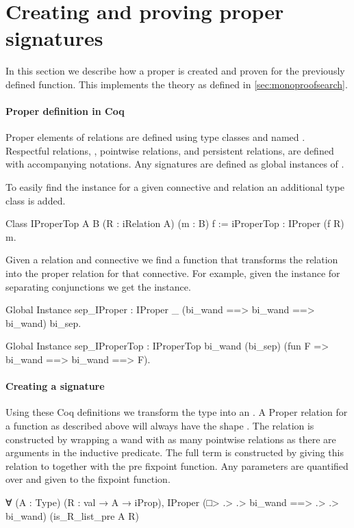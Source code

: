 \documentclass[thesis.tex]{subfiles}
\begin{document}
\section{Creating and proving proper signatures}\label{sec:constrsig}
In this section we describe how a proper is created and proven for the previously defined function. This implements the theory as defined in \cref{sec:monoproofsearch}.

\paragraph{Proper definition in Coq}
Proper elements of relations are defined using type classes and named . Respectful relations, , pointwise relations,  and persistent relations,  are defined with accompanying notations. Any signatures are defined as global instances of .

To easily find the  instance for a given connective and relation an additional type class is added.
\begin{coqcode}
  Class IProperTop {A} {B} 
                   (R : iRelation A) (m : B) 
                   f := iProperTop : IProper (f R) m.
\end{coqcode}
Given a relation  and connective  we find a function  that transforms the relation into the proper relation for that connective. For example, given the  instance for separating conjunctions we get the  instance.
\begin{coqcode}
  Global Instance sep_IProper : 
    IProper _ (bi_wand ==> bi_wand ==> bi_wand) 
             bi_sep.

  Global Instance sep_IProperTop : 
    IProperTop bi_wand (bi_sep) 
               (fun F => bi_wand ==> bi_wand ==> F).
\end{coqcode}

\paragraph{Creating a signature}
Using these Coq definitions we transform the type into an . A Proper relation for a function as described above will always have the shape . The relation  is constructed by wrapping a wand with as many pointwise relations as there are arguments in the inductive predicate. The full  term is constructed by giving this relation to  together with the pre fixpoint function. Any parameters are quantified over and given to the fixpoint function.
\begin{coqcode}
  ∀ (A : Type) (R : val → A → iProp),
    IProper (□> .> .> bi_wand ==> .> .> bi_wand) 
            (is_R_list_pre A R)
\end{coqcode}
\end{document}
